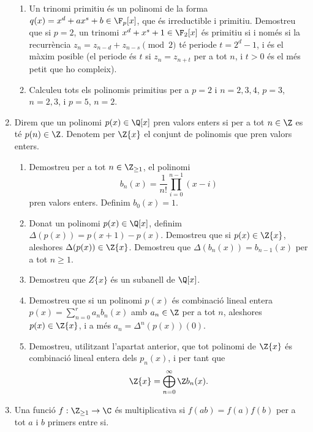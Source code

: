 \begin{enumerate}[leftmargin=*]
\begin{enumerate}
\item Un trinomi primitiu és un polinomi de la forma $q(x)=x^d+ax^s+b\in
\F_p[x]$, que és irreductible i primitiu. Demostreu que si $p=2$, un
trinomi $x^d+x^s+1\in \F_2[x]$ és primitiu si i només si la
recurr\`{e}ncia $z_n=z_{n-d}+z_{n-s} \pmod{2}$ té periode $t=2^d-1$, i
és el màxim posible (el periode és $t$ si $z_{n}=z_{n+t}$ per a tot
$n$, i $t>0$ és el més petit que ho compleix).


\item Calculeu tots els polinomis primitius per a $p=2$ i $n=2,3,4$, $p=3$, $n=2,3$, i
$p=5$, $n=2$.

\end{enumerate}

\item Direm que un polinomi $p(x)\in \Q[x]$ pren valors
enters si per a tot $n\in \Z$ es té  $p(n)\in \Z$. Denotem per
$\Z\{x\}$ el conjunt de polinomis que pren valors enters.

\begin{enumerate}
\item Demostreu per a tot $n\in \Z_{\ge 1}$, el polinomi
$$b_n(x)=\frac1{n!} \prod_{i=0}^{n-1} (x-i)$$
pren valors enters. Definim $b_0(x)=1$.

\item Donat un polinomi $p(x)\in \Q[x]$, definim
$\Delta(p(x))=p(x+1)-p(x)$. Demostreu que si $p(x)\in \Z\{x\}$,
aleshores $\Delta(p(x))\in \Z\{x\}$. Demostreu que
$\Delta(b_n(x))=b_{n-1}(x)$ per a tot $n\ge 1$.

\item Demostreu que $Z\{x\}$ és un subanell de $\Q[x]$.

\item Demostreu que si un polinomi $p(x)$ és combinació lineal entera
$p(x)=\sum_{n=0}^r a_n b_n(x)$
amb $a_n\in \Z$ per a tot $n$, aleshores $p(x)\in \Z\{x\}$, i a més
$a_n=\Delta^{n}(p(x))(0)$.

\item Demostreu, utilitzant l'apartat anterior, que tot polinomi de
$\Z\{x\}$ és combinació lineal entera dels $p_n(x)$, i per tant que
$$\Z\{x\}=\bigoplus_{n=0}^{\infty} \Z b_n(x). $$


\end{enumerate}

\item Una funció $f:\Z_{\ge 1} \to \C$ és
multiplicativa si $f(a b)=f(a)  f(b)$ per a tot $a$ i $b$
primers entre si.

\begin{enumerate}


\end{enumerate}
\end{enumerate}
